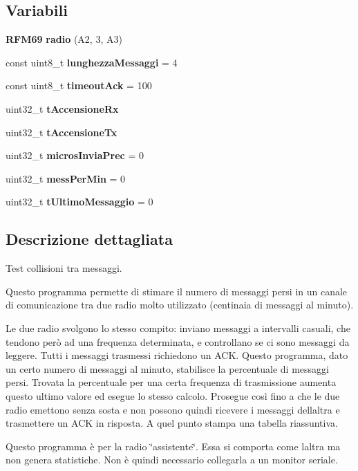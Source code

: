 \subsection*{Variabili}
\begin{DoxyCompactItemize}
\item 
\mbox{\label{_test__collisioni__assistente_8cpp_a4801927c117e14f77944af1e13348ffe}} 
\textbf{ R\+F\+M69} {\bfseries radio} (A2, 3, A3)
\item 
\mbox{\label{_test__collisioni__assistente_8cpp_a8cfea90381d7fadea030081a4e76880f}} 
const uint8\+\_\+t {\bfseries lunghezza\+Messaggi} = 4
\item 
\mbox{\label{_test__collisioni__assistente_8cpp_afd18a66052dc75024e8cae2c4e6d2f2c}} 
const uint8\+\_\+t {\bfseries timeout\+Ack} = 100
\item 
\mbox{\label{_test__collisioni__assistente_8cpp_a05c81c9373c9a980ebfd57611013d17a}} 
uint32\+\_\+t {\bfseries t\+Accensione\+Rx}
\item 
\mbox{\label{_test__collisioni__assistente_8cpp_ad95c317a1d748e767db7893c59224c6e}} 
uint32\+\_\+t {\bfseries t\+Accensione\+Tx}
\item 
\mbox{\label{_test__collisioni__assistente_8cpp_a94269026a3225b603f8571c95818422e}} 
uint32\+\_\+t {\bfseries micros\+Invia\+Prec} = 0
\item 
\mbox{\label{_test__collisioni__assistente_8cpp_a13da80fe40e76e40698fedab534f9182}} 
uint32\+\_\+t {\bfseries mess\+Per\+Min} = 0
\item 
\mbox{\label{_test__collisioni__assistente_8cpp_ae4f27fd6b4d47a79b22b2356828fb251}} 
uint32\+\_\+t {\bfseries t\+Ultimo\+Messaggio} = 0
\end{DoxyCompactItemize}


\subsection{Descrizione dettagliata}
Test collisioni tra messaggi. 

Questo programma permette di stimare il numero di messaggi persi in un canale di comunicazione tra due radio molto utilizzato (centinaia di messaggi al minuto).

Le due radio svolgono lo stesso compito\+: inviano messaggi a intervalli casuali, che tendono però ad una frequenza determinata, e controllano se ci sono messaggi da leggere. Tutti i messaggi trasmessi richiedono un A\+CK. Questo programma, dato un certo numero di messaggi al minuto, stabilisce la percentuale di messaggi persi. Trovata la percentuale per una certa frequenza di trasmissione aumenta questo ultimo valore ed esegue lo stesso calcolo. Prosegue così fino a che le due radio emettono senza sosta e non possono quindi ricevere i messaggi dell\textquotesingle{}altra e trasmettere un A\+CK in risposta. A quel punto stampa una tabella riassuntiva.

Questo programma è per la radio \char`\"{}assistente\char`\"{}. Essa si comporta come l\textquotesingle{}altra ma non genera statistiche. Non è quindi necessario collegarla a un monitor seriale. 